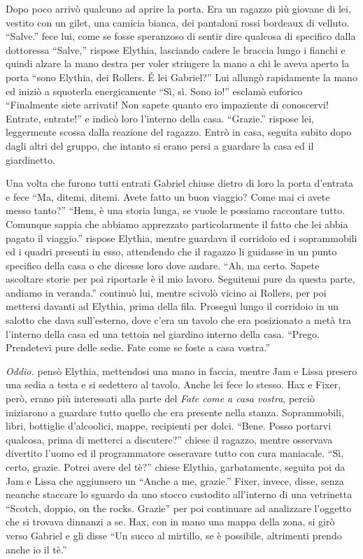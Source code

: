     Dopo poco arrivò qualcuno ad aprire la porta. Era un ragazzo più
    giovane di lei, vestito con un gilet, una camicia bianca, dei pantaloni
    rossi bordeaux di velluto. ``Salve.'' fece lui, come se fosse
    speranzoso di sentir dire qualcosa di specifico dalla dottoressa
    ``Salve,'' rispose Elythia, lasciando cadere le braccia lungo i fianchi
    e quindi alzare la mano destra per voler stringere la mano a chi le
    aveva aperto la porta ``sono Elythia, dei Rollers. \'E lei Gabriel?''
    Lui allungò rapidamente la mano ed iniziò a squoterla energicamente
    ``Sì, sì. Sono io!'' esclamò euforico ``Finalmente siete arrivati! Non
    sapete quanto ero impaziente di conoscervi! Entrate, entrate!'' e
    indicò loro l'interno della casa. ``Grazie.'' rispose lei, leggermente
    scossa dalla reazione del ragazzo. Entrò in casa, seguita subito dopo
    dagli altri del gruppo, che intanto si erano persi a guardare la casa
    ed il giardinetto.

    Una volta che furono tutti entrati Gabriel chiuse dietro di loro la
    porta d'entrata e fece ``Ma, ditemi, ditemi. Avete fatto un buon
    viaggio? Come mai ci avete messo tanto?'' ``Hem, è una storia lunga, se
    vuole le possiamo raccontare tutto. Comunque sappia che abbiamo
    apprezzato particolarmente il fatto che lei abbia pagato il viaggio.''
    rispose Elythia, mentre guardava il corridoio ed i soprammobili ed i
    quadri presenti in esso, attendendo che il ragazzo li guidasse in un
    punto specifico della casa o che dicesse loro dove andare. ``Ah, ma
    certo. Sapete ascoltare storie per poi riportarle è il mio lavoro.
    Seguitemi pure da questa parte, andiamo in veranda.'' continuò lui,
    mentre scivolò vicino ai Rollers, per poi mettersi davanti ad Elythia,
    prima della fila. Proseguì lungo il corridoio in un salotto che dava
    sull'esterno, dove c'era un tavolo che era posizionato a metà tra
    l'interno della casa ed una tettoia nel giardino interno della casa.
    ``Prego. Prendetevi pure delle sedie. Fate come se foste a casa
    vostra.''

    \emph{Oddio.} pensò Elythia, mettendosi una mano in faccia, mentre Jam
    e Lissa presero una sedia a testa e si sedettero al tavolo. Anche lei
    fece lo stesso. Hax e Fixer, però, erano più interessati alla parte del
    \emph{Fate come a casa vostra}, perciò iniziarono a guardare tutto
    quello che era presente nella stanza. Soprammobili, libri, bottiglie
    d'alcoolici, mappe, recipienti per dolci. ``Bene. Posso portarvi
    qualcosa, prima di metterci a discutere?'' chiese il ragazzo, mentre
    osservava divertito l'uomo ed il programmatore osseravare tutto con
    cura maniacale. ``Sì, certo, grazie. Potrei avere del tè?'' chiese
    Elythia, garbatamente, seguita poi da Jam e Lissa che aggiunsero un
    ``Anche a me, grazie.'' Fixer, invece, disse, senza neanche staccare lo
    sguardo da uno stocco custodito all'interno di una vetrinetta ``Scotch,
    doppio, on the rocks. Grazie'' per poi continuare ad analizzare
    l'oggetto che si trovava dinnanzi a se. Hax, con in mano una mappa
    della zona, si girò verso Gabriel e gli disse ``Un succo al mirtillo,
    se è possibile, altrimenti prendo anche io il tè.''

